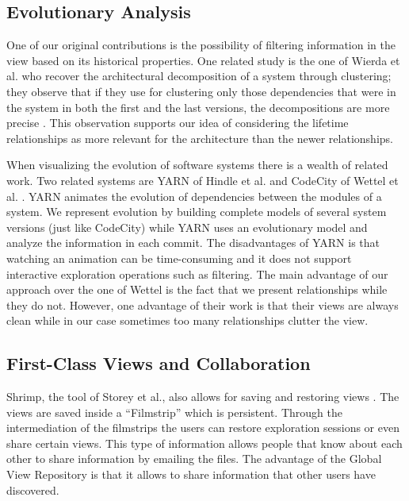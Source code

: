 \documentclass[preprint,12pt]{elsarticle}
\begin{document}
\subsection {Evolutionary Analysis}
 
One of our original contributions is the possibility of filtering information in the view based on its historical properties. One related study is the one of Wierda et al. who recover the architectural decomposition of a system through clustering; they observe that if they use for clustering only those dependencies that were in the system in both the first and the last versions, the decompositions are more precise \cite{wierda-clustering}. This observation supports our idea of considering the lifetime relationships as more relevant for the architecture than the newer relationships. 

When visualizing the evolution of software systems there is a wealth of related work. Two related systems are YARN of Hindle et al. \cite{hindle-yarn} and CodeCity of Wettel et al. \cite{wettel-icse11}. YARN animates the evolution of dependencies between the modules of a system. We represent evolution by building complete models of several system versions (just like CodeCity) while YARN uses an evolutionary model and analyze the information in each commit. The disadvantages of YARN is that watching an animation can be time-consuming and it does not support interactive exploration operations such as filtering. The main advantage of our approach over the one of Wettel is the fact that we present relationships while they do not. However, one advantage of their work is that their views are always clean while in our case sometimes too many relationships clutter the view.

\subsection {First-Class Views and Collaboration} 

Shrimp, the tool of Storey et al., also allows for saving and restoring views \cite{rayside-flow}. The views are saved inside a ``Filmstrip'' which is persistent. Through the intermediation of the filmstrips the users can restore exploration sessions or even share certain views. This type of information allows people that know about each other to share information by emailing the files. The advantage of the Global View Repository is that it allows to share information that other users have discovered. 
\end{document}
